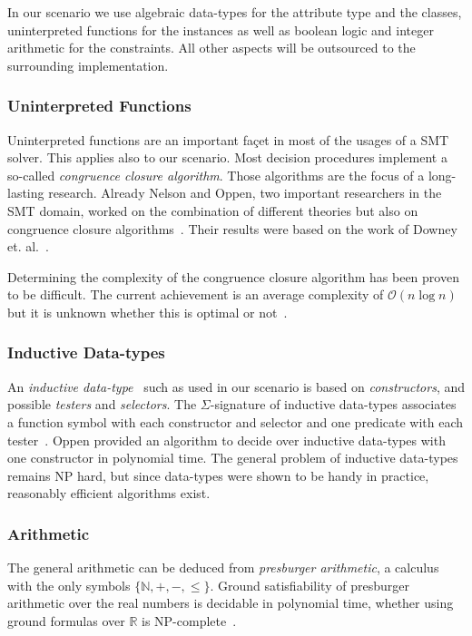 In our scenario we use algebraic data-types for the attribute type and the classes, uninterpreted functions for the instances as well as boolean logic and integer arithmetic for the constraints. All other aspects will be outsourced to the surrounding implementation.

\subsubsection*{Uninterpreted Functions}

Uninterpreted functions are an important fa\c{c}et in most of the usages of a SMT solver. This applies also to our scenario. Most decision procedures implement a so-called \emph{congruence closure algorithm}. Those algorithms are the focus of a long-lasting research. Already Nelson and Oppen, two important researchers in the SMT domain, worked on the combination of different theories but also on congruence closure algorithms~\cite{nels-oppen}. Their results were based on the work of Downey et. al.~\cite{congruence-closure}. 

Determining the complexity of the congruence closure algorithm has been proven to be difficult. The current achievement is an average complexity of $\mathcal{O}(n \log n)$ but it is unknown whether this is optimal or not~\cite{smt-challenge}.





\subsubsection*{Inductive Data-types}

An \emph{inductive data-type}~\cite{smt-book} such as used in our scenario is based on  \emph{constructors}, and possible \emph{testers} and \emph{selectors}. The  $\Sigma$-signature of inductive data-types associates a function symbol with each constructor and selector and one predicate with each tester~\cite{smt-book}. Oppen provided an algorithm to decide over inductive data-types with one constructor in polynomial time. The general problem of inductive data-types remains NP hard, but since data-types were shown to be handy in practice, reasonably efficient algorithms exist.

\subsubsection*{Arithmetic}
The general arithmetic can be deduced from \emph{presburger arithmetic}, a calculus with the only symbols $\{\mathbb{N}, +, -, \leq\}$. Ground satisfiability of presburger arithmetic over the real numbers is decidable in polynomial time, whether using ground formulas over $\mathbb{R}$ is NP-complete~\cite{smt-book}.

